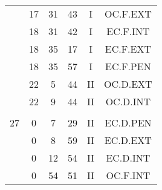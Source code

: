 \documentclass[12pt, a4paper]{article}
\begin{document}
\begin{multicols}{3}
{\begin{tabular}{c c c c c c}
	 	 	 	 & 17 & 31 & 43 & I & OC.F.EXT\\%
	 	 	 	 & 18 & 31 & 42 & I & EC.F.INT\\%
	 	 	 	 & 18 & 35 & 17 & I & EC.F.EXT\\%
	 	 	 	 & 18 & 35 & 57 & I & EC.F.PEN\\%
	 	 	 	 & 22 & 5 & 44 & II & OC.D.EXT\\%
	 	 	 	 & 22 & 9 & 44 & II & OC.D.INT\\%
	 	 	 	 & & & & & \\%
	 	 	 	27 & 0 & 7 & 29 & II & EC.D.PEN\\%
	 	 	 	 & 0 & 8 & 59 & II & EC.D.EXT\\%
	 	 	 	 & 0 & 12 & 54 & II & EC.D.INT\\%
	 	 	 	 & 0 & 54 & 51 & II & OC.F.INT\\%
	 	 \end{tabular}
 	}
\end{multicols}
\end{document}
